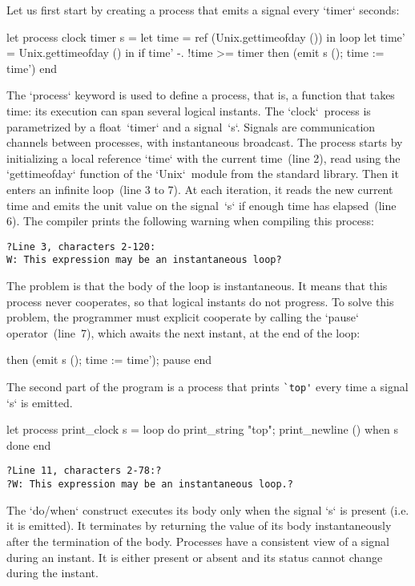 \documentclass[9pt,preprint]{sigplanconf}
\begin{document}
Let us first start by creating a process that emits a signal every `timer` seconds:
%
\begin{rmlcl}
let process clock timer s =
  let time = ref (Unix.gettimeofday ()) in
  loop
    let time' = Unix.gettimeofday () in
    if time' -. !time >= timer
    then (emit s (); time := time')
  end
\end{rmlcl}
%
The `process` keyword is used to define a process, that is, a function that takes time: its execution can span several logical instants. The `clock`~process is parametrized by a float~`timer` and a signal~`s`. Signals are communication channels between processes, with instantaneous broadcast. The process starts by initializing a local reference `time` with the current time~(line 2), read using the `gettimeofday` function of the `Unix`~module from the standard library. Then it enters an infinite loop~(line 3 to 7). At each iteration, it reads the new current time and emits the unit value on the signal~`s` if enough time has elapsed~(line 6). The compiler prints the following warning when compiling this process:
\begin{lstlisting}
?Line 3, characters 2-120:
W: This expression may be an instantaneous loop?
\end{lstlisting}
The problem is that the body of the loop is instantaneous. It means that this process never cooperates, so that logical instants do not progress. To solve this problem, the programmer must explicit cooperate by calling the `pause` operator~(line~7), which awaits the next instant, at the end of the loop:
\begin{rmlcl}[5]
[...]
    then (emit s (); time := time');
    pause 
  end
\end{rmlcl}

The second part of the program is a process that prints \verb+`top'+ every time a signal `s` is emitted. 
\begin{rmlcl}[10]
let process print_clock s =
  loop
    do
      print_string "top"; print_newline ()
    when s done
  end
\end{rmlcl}
\begin{lstlisting}
?Line 11, characters 2-78:?
?W: This expression may be an instantaneous loop.?
\end{lstlisting}
%
The `do/when` construct executes its body only when the signal `s` is present (i.e. it is emitted). It terminates by returning the value of its body instantaneously after the termination of the body. Processes have a consistent view of a signal during an instant. It is either present or absent and its status cannot change during the instant.
\end{document}
